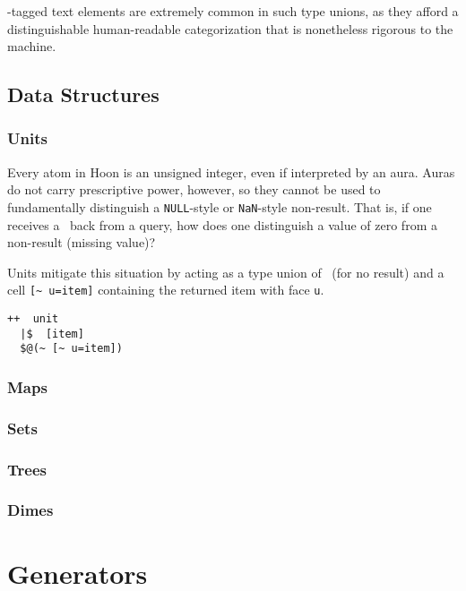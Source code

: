 \pattas-tagged text elements are extremely common in such type unions, as they afford a distinguishable human-readable categorization that is nonetheless rigorous to the machine.


\subsection{Data Structures}

\subsubsection{Units}

Every atom in Hoon is an unsigned integer, even if interpreted by an aura.  Auras do not carry prescriptive power, however, so they cannot be used to fundamentally distinguish a \texttt{NULL}-style or \texttt{NaN}-style non-result.  That is, if one receives a \sig~back from a query, how does one distinguish a value of zero from a non-result (missing value)?

Units mitigate this situation by acting as a type union of \sig~(for no result) and a cell \texttt{[\textasciitilde~u=item]} containing the returned item with face \texttt{u}.

\begin{lstlisting}[style=nonumbers]
++  unit
  |$  [item]
  $@(~ [~ u=item])
\end{lstlisting}


\subsubsection{Maps}

\subsubsection{Sets}

\subsubsection{Trees}

\subsubsection{Dimes}


\section{Generators}

